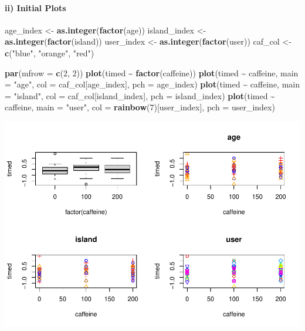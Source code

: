 \documentclass[
]{article}
\newenvironment{Shaded}{\begin{snugshade}}{\end{snugshade}}
\newcommand{\AttributeTok}[1]{\textcolor[rgb]{0.13,0.29,0.53}{#1}}
\newcommand{\DecValTok}[1]{\textcolor[rgb]{0.00,0.00,0.81}{#1}}
\newcommand{\FunctionTok}[1]{\textcolor[rgb]{0.13,0.29,0.53}{\textbf{#1}}}
\newcommand{\NormalTok}[1]{#1}
\newcommand{\OtherTok}[1]{\textcolor[rgb]{0.56,0.35,0.01}{#1}}
\newcommand{\SpecialCharTok}[1]{\textcolor[rgb]{0.81,0.36,0.00}{\textbf{#1}}}
\newcommand{\StringTok}[1]{\textcolor[rgb]{0.31,0.60,0.02}{#1}}
\begin{document}
\paragraph{ii) Initial Plots}\label{ii-initial-plots}

\begin{Shaded}
\begin{Highlighting}[]
\NormalTok{age\_index }\OtherTok{\textless{}{-}} \FunctionTok{as.integer}\NormalTok{(}\FunctionTok{factor}\NormalTok{(age))}
\NormalTok{island\_index }\OtherTok{\textless{}{-}} \FunctionTok{as.integer}\NormalTok{(}\FunctionTok{factor}\NormalTok{(island))}
\NormalTok{user\_index }\OtherTok{\textless{}{-}} \FunctionTok{as.integer}\NormalTok{(}\FunctionTok{factor}\NormalTok{(user))}
\NormalTok{caf\_col }\OtherTok{\textless{}{-}} \FunctionTok{c}\NormalTok{(}\StringTok{"blue"}\NormalTok{, }\StringTok{"orange"}\NormalTok{, }\StringTok{"red"}\NormalTok{)}

\FunctionTok{par}\NormalTok{(}\AttributeTok{mfrow =} \FunctionTok{c}\NormalTok{(}\DecValTok{2}\NormalTok{, }\DecValTok{2}\NormalTok{))}
\FunctionTok{plot}\NormalTok{(timed }\SpecialCharTok{\textasciitilde{}} \FunctionTok{factor}\NormalTok{(caffeine))}
\FunctionTok{plot}\NormalTok{(timed }\SpecialCharTok{\textasciitilde{}}\NormalTok{ caffeine, }\AttributeTok{main =} \StringTok{"age"}\NormalTok{,}
     \AttributeTok{col =}\NormalTok{ caf\_col[age\_index], }\AttributeTok{pch =}\NormalTok{ age\_index)}
\FunctionTok{plot}\NormalTok{(timed }\SpecialCharTok{\textasciitilde{}}\NormalTok{ caffeine, }\AttributeTok{main =} \StringTok{"island"}\NormalTok{,}
     \AttributeTok{col =}\NormalTok{ caf\_col[island\_index], }\AttributeTok{pch =}\NormalTok{ island\_index)}
\FunctionTok{plot}\NormalTok{(timed }\SpecialCharTok{\textasciitilde{}}\NormalTok{ caffeine, }\AttributeTok{main =} \StringTok{"user"}\NormalTok{,}
     \AttributeTok{col =} \FunctionTok{rainbow}\NormalTok{(}\DecValTok{7}\NormalTok{)[user\_index], }\AttributeTok{pch =}\NormalTok{ user\_index)}
\end{Highlighting}
\end{Shaded}

\includegraphics{island_caffeine_files/figure-latex/basic plots-1.pdf}
\end{document}
